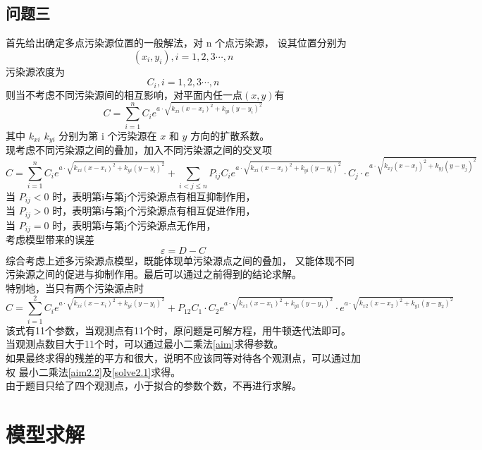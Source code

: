 \documentclass[UTF8]{ctexart}
\begin{document}
  \subsection{问题三}
  首先给出确定多点污染源位置的一般解法，对 n 个点污染源，
  设其位置分别为
  $$(x_i,y_i) , i=1,2,3\cdots ,n$$ 
  污染源浓度为
  $$ C_i , i=1,2,3\cdots,n $$
  则当不考虑不同污染源间的相互影响，对平面内任一点$(x,y)$有
  \begin{equation}\label{p3.1}
    C=\sum\limits_{i=1}^{n}{C_i e^{a\cdot \sqrt{k_{xi}(x-x_i)^2+k_{yi}(y-y_i)^2}}}
  \end{equation}
  其中 $k_{xi}$ $k_{yi}$ 分别为第 i 个污染源在 $x$ 和 $y$ 方向的扩散系数。\cite{gaozhen}\\
  现考虑不同污染源之间的叠加，加入不同污染源之间的交叉项
  \begin{equation}\label{p3.2}
    C=\sum\limits_{i=1}^{n}{C_i e^{a\cdot \sqrt{k_{xi}(x-x_i)^2+k_{yi}(y-y_i)^2}}}
    +\sum\limits_{i<j\leq n}{P_{ij}C_i e^{a\cdot \sqrt{k_{xi}(x-x_i)^2+k_{yi}(y-y_i)^2}}
    \cdot C_j\cdot e^{a\cdot \sqrt{k_{xj}(x-x_j)^2+k_{yj}(y-y_j)^2}}}
  \end{equation}
  当 $P_{ij}<0$ 时，表明第i与第j个污染源点有相互抑制作用，\\
  当 $P_{ij}>0$ 时，表明第i与第j个污染源点有相互促进作用，\\
  当 $P_{ij}=0$ 时，表明第i与第j个污染源点无作用，\\
  考虑模型带来的误差
    $$\varepsilon=D-C $$
  综合考虑上述多污染源点模型，既能体现单污染源点之间的叠加，
  又能体现不同污染源之间的促进与抑制作用。最后可以通过之前得到的结论求解。\\
  特别地，当只有两个污染源点时
  \begin{equation}\label{p3.3}
    C=\sum\limits_{i=1}^{2}{C_i e^{a \cdot \sqrt{k_{xi}(x-x_i)^2+k_{yi}(y-y_i)^2}}}
    +P_{12}C_1\cdot C_2 e^{a \cdot \sqrt{k_{x1}(x-x_1)^2+k_{y1}(y-y_1)^2}}\cdot 
    e^{a\cdot \sqrt{k_{x2}(x-x_2)^2+k_{y1}(y-y_2)^2}}
  \end{equation}
  该式有11个参数，当观测点有11个时，原问题是可解方程，用牛顿迭代法即可。\\
  当观测点数目大于11个时，可以通过最小二乘法\ref{aim}求得参数。\\
  如果最终求得的残差的平方和很大，说明不应该同等对待各个观测点，可以通过加权
  最小二乘法\ref{aim2.2}及\ref{solve2.1}求得。\\
  由于题目只给了四个观测点，小于拟合的参数个数，不再进行求解。
\newpage
\section{模型求解}
\end{document}
